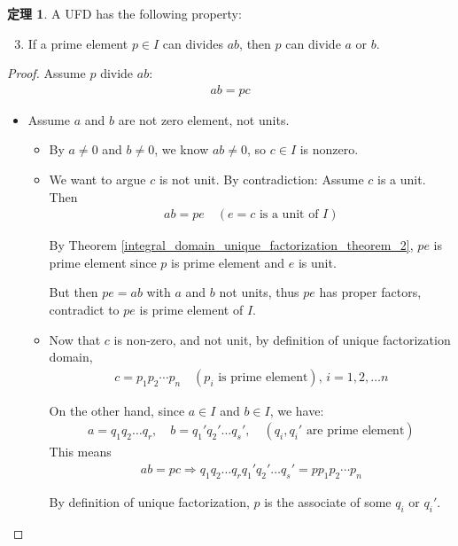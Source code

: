 \documentclass[utf8]{ctexbook}
\theoremstyle{definition}
\newtheorem{prototheorem}{定理}[section]
\newenvironment{theorem}
   {\colorlet{shadecolor}{pink!30}\begin{shaded}\begin{prototheorem}}
   {\end{prototheorem}\end{shaded}}
\begin{document}
\begin{theorem}
A UFD has the following property:
\begin{enumerate}
\setcounter{enumi}{2}
\item{If a prime element $p \in I$ can divides $ab$, then $p$ can divide $a$ or $b$.}
\end{enumerate}
\end{theorem}

\begin{proof}
Assume $p$ divide $ab$:
\begin{align*}
ab = p c
\end{align*}

\begin{itemize}
\item{Assume $a$ and $b$ are not zero element, not units.}
\begin{itemize}
\item{By $a \neq 0$ and $b \neq 0$, we know $ab \neq 0$, so $c \in I$ is nonzero.}
\item{We want to argue $c$ is not unit. By contradiction: Assume $c$ is a unit. Then 
\begin{align*}
ab = p e \quad (e = c \mbox{  is a unit of } I)
\end{align*}

By Theorem \ref{integral_domain_unique_factorization_theorem_2}, $pe$ is prime element since $p$ is prime element and $e$ is unit.

But then $pe = ab$ with $a$ and $b$ not units, thus $pe$ has proper factors, contradict to $pe$ is prime element of $I$.
}
\item{Now that $c$ is non-zero, and not unit, by definition of unique factorization domain,
\begin{align*}
c = p_1 p_2 \cdots p_n \quad (p_i \mbox{ is prime element}), \, i = 1, 2, \ldots n
\end{align*}

On the other hand, since $a \in I$ and $b \in I$, we have:
\begin{align*}
a = q_1 q_2 \ldots q_r, \quad b = q_1 ' q_2 ' \ldots q_s ', \quad (q_i, q_i ' \mbox{ are prime element})
\end{align*}
This means
\begin{align*}
ab = pc \Longrightarrow q_1 q_2 \ldots q_r q_1 ' q_2 ' \ldots q_s ' = p p_1 p_2 \cdots p_n 
\end{align*}

By definition of unique factorization, $p$ is the associate of some $q_i$ or $q_i '$.

}
\end{itemize}
\end{itemize}
\end{proof}
\end{document}
